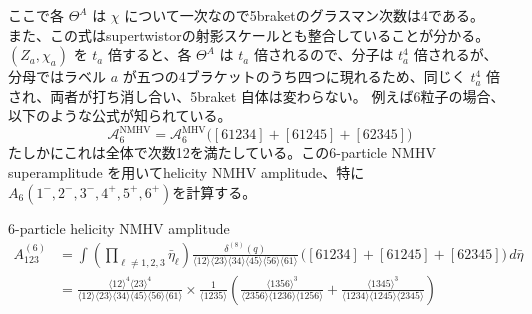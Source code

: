 \documentclass[uplatex,dvipdfmx,a4paper,11pt]{jsarticle}
\numberwithin{equation}{section}
\begin{document}
ここで各 \(\Theta^A\) は \(\chi\) について一次なので5braketのグラスマン次数は4である。\\
また、この式はsupertwistorの射影スケールとも整合していることが分かる。
\((Z_a,\chi_a)\) を \(t_a\) 倍すると、各 \(\Theta^A\) は \(t_a\) 倍されるので、分子は \(t_a^4\) 倍されるが、
分母ではラベル \(a\) が五つの4ブラケットのうち四つに現れるため、同じく \(t_a^4\) 倍され、両者が打ち消し合い、5braket 自体は変わらない。
例えば6粒子の場合、以下のような公式が知られている。
\begin{equation}
\mathcal A_6^{\mathrm{NMHV}}
=
\mathcal A_6^{\mathrm{MHV}}
\bigl(
[61234]+[61245]+[62345]
\bigr)
\end{equation}
たしかにこれは全体で次数12を満たしている。この6-particle NMHV superamplitude を用いてhelicity NMHV amplitude、特に
$A_6(1^-,2^-,3^-,4^+,5^+,6^+)$を計算する。
\begin{mythm}{6-particle helicity NMHV amplitude}
\begin{equation}
  \begin{aligned}
    A_{123}^{(6)}
&=
\int
\left(
\prod_{\ell\neq 1,2,3}\bar\eta_\ell
\right)
\frac{\delta^{(8)}(q)}{
\langle12\rangle\langle23\rangle
\langle34\rangle\langle45\rangle
\langle56\rangle\langle61\rangle
}\,
\bigl(
[61234]+[61245]+[62345]
\bigr)\,
d\bar\eta\\
  &=\frac{
\langle12\rangle^4\langle23\rangle^4
}{
\langle12\rangle\langle23\rangle
\langle34\rangle\langle45\rangle
\langle56\rangle\langle61\rangle
}\times
\frac{1}{\langle1235\rangle}
\left(
\frac{
\langle1356\rangle^3
}{
\langle2356\rangle
\langle1236\rangle
\langle1256\rangle
}
+
\frac{
\langle1345\rangle^3
}{
\langle1234\rangle
\langle1245\rangle
\langle2345\rangle
}
\right)
  \end{aligned}
\end{equation}
\end{mythm}
\end{document}
